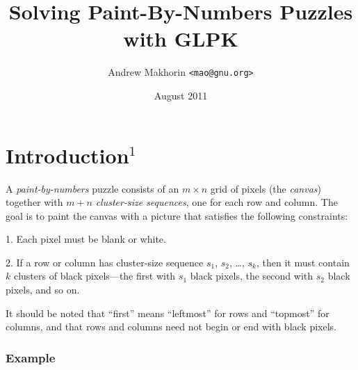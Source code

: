 \documentclass[11pt,draft]{article}
\begin{document}
\title{Solving Paint-By-Numbers Puzzles with GLPK}

\author{Andrew Makhorin {\tt<mao@gnu.org>}}

\date{August 2011}

\maketitle

\section{Introduction$^1$}


A {\it paint-by-numbers} puzzle consists of an $m\times n$ grid of
pixels (the {\it canvas}) together with $m+n$ {\it cluster-size
sequences}, one for each row and column. The goal is to paint the canvas
with a picture that satisfies the following constraints:

1. Each pixel must be blank or white.

2. If a row or column has cluster-size sequence $s_1$, $s_2$, \dots,
$s_k$, then it must contain $k$ clusters of black pixels---the first
with $s_1$ black pixels, the second with $s_2$ black pixels, and so on.

It should be noted that ``first'' means ``leftmost'' for rows and
``topmost'' for columns, and that rows and columns need not begin or end
with black pixels.

\subsubsection*{Example}

\def\arraystretch{.8}
\end{document}
